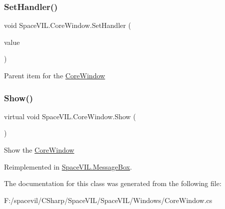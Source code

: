 \subsubsection{\texorpdfstring{Set\+Handler()}{SetHandler()}}
{\footnotesize\ttfamily void Space\+V\+I\+L.\+Core\+Window.\+Set\+Handler (\begin{DoxyParamCaption}\item[{\mbox{\hyperlink{class_space_v_i_l_1_1_window_layout}{Window\+Layout}}}]{value }\end{DoxyParamCaption})}



Parent item for the \mbox{\hyperlink{class_space_v_i_l_1_1_core_window}{Core\+Window}} 

\mbox{\label{class_space_v_i_l_1_1_core_window_a6f25e26e98c54d56d93b0abfc88af3c0}} 
\subsubsection{\texorpdfstring{Show()}{Show()}}
{\footnotesize\ttfamily virtual void Space\+V\+I\+L.\+Core\+Window.\+Show (\begin{DoxyParamCaption}{ }\end{DoxyParamCaption})\hspace{0.3cm}{\ttfamily [virtual]}}



Show the \mbox{\hyperlink{class_space_v_i_l_1_1_core_window}{Core\+Window}} 



Reimplemented in \mbox{\hyperlink{class_space_v_i_l_1_1_message_box_a2d2963f79fd8eb73c03872eee52b4331}{Space\+V\+I\+L.\+Message\+Box}}.



The documentation for this class was generated from the following file\+:\begin{DoxyCompactItemize}
\item 
F\+:/spacevil/\+C\+Sharp/\+Space\+V\+I\+L/\+Space\+V\+I\+L/\+Windows/Core\+Window.\+cs\end{DoxyCompactItemize}
